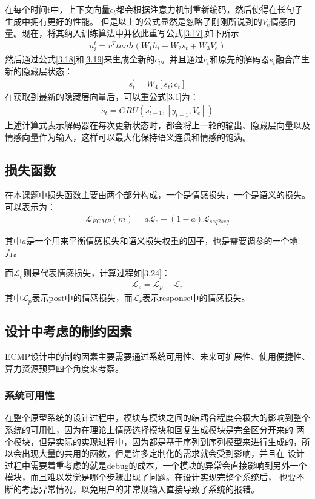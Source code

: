 \documentclass[supercite]{HustGraduPaper}
\theoremstyle{definition}
\begin{document}
在每个时间t中，上下文向量$c_t$都会根据注意力机制重新编码，然后使得在长句子生成中拥有更好的性能。
但是以上的公式显然是忽略了刚刚所说到的$V_e$情感向量。现在，将其纳入训练算法中并依此重写公式\ref{3.17},如下所示
\begin{align}
  u_i^t = v^T tanh(W_1h_i + W_2 s_t + W_3V_e) \label{3.20}
\end{align}
然后通过公式\ref{3.18}和\ref{3.19}来生成全新的$c_t$。并且通过$c_t$和原先的解码器$s_t$融合产生新的隐藏层状态：
\begin{align}
  s^{'}_t = W_4[s_t;c_t] \label{3.21}
\end{align}
在获取到最新的隐藏层向量后，可以重公式\ref{3.1}为：
\begin{align}
  s_t = GRU(s^{'}_{t-1},[y_{t-1};V_e]) \label{3.22}
\end{align}
上述计算式表示解码器在每次更新状态时，都会将上一轮的输出、隐藏层向量以及情感向量作为输入，这样可以最大化保持语义连贯和情感的饱满。

\subsection{损失函数}
在本课题中损失函数主要由两个部分构成，一个是情感损失，一个是语义的损失。可以表示为：
\begin{align}
  \mathcal{L}_{ECMP} (m) = a \mathcal{L}_e + (1-a)\mathcal{L}_{seq2seq} \label{3.23}
\end{align}

其中$a$是一个用来平衡情感损失和语义损失权重的因子，也是需要调参的一个地方。

而$\mathcal{L}_e$则是代表情感损失，计算过程如\ref{3.24}：
\begin{align}
  \mathcal{L}_e = \mathcal{L}_p + \mathcal{L}_r \label{3.24}
\end{align}
其中$\mathcal{L}_p$表示post中的情感损失，而$\mathcal{L}_r$表示response中的情感损失。

\subsection{设计中考虑的制约因素}
ECMP设计中的制约因素主要需要通过系统可用性、未来可扩展性、使用便捷性、算力资源预算四个角度来考察。
\subsubsection{系统可用性}
在整个原型系统的设计过程中，模块与模块之间的结耦合程度会极大的影响到整个系统的可用性，因为在理论上情感选择模块和回复生成模块是完全区分开来的
两个模块，但是实际的实现过程中，因为都是基于序列到序列模型来进行生成的，所以会出现大量的共用的函数，但是许多定制化的需求就会受到影响，并且在
设计过程中需要着重考虑的就是debug的成本，一个模块的异常会直接影响到另外一个模块，而且难以发觉是哪个步骤出现了问题。在设计实现完整个系统后，
也要不断的考虑异常情况，以免用户的非常规输入直接导致了系统的报错。
\end{document}
